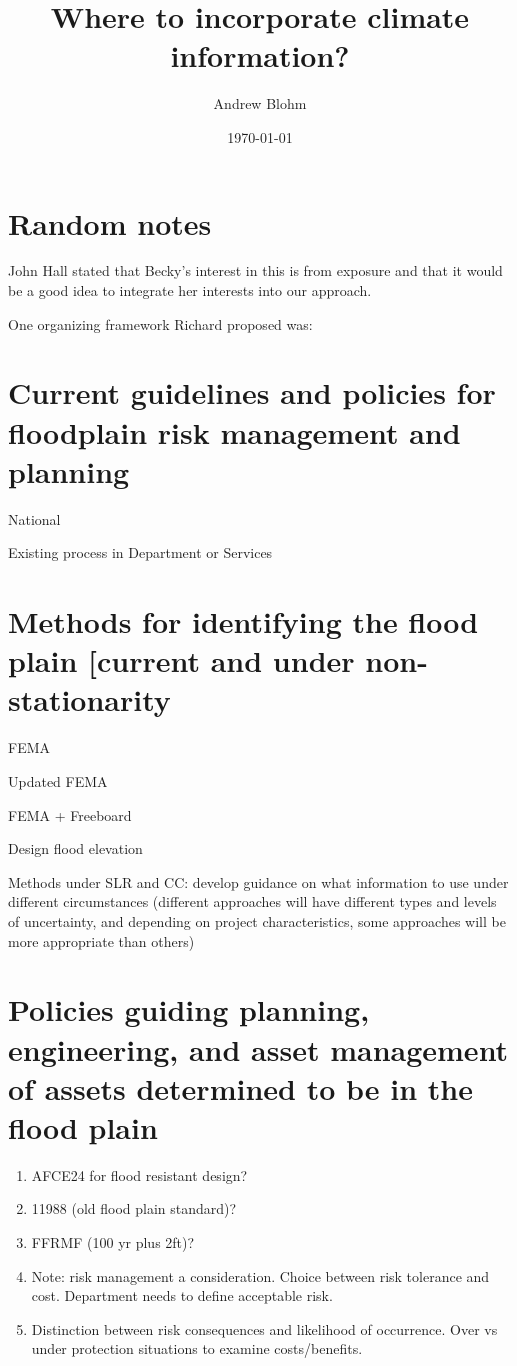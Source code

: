 \documentclass[10pt]{amsart}
\title{Where to incorporate climate information?}
\author{Andrew Blohm}
\date{\today}
\begin{document}
\maketitle
\section{Random notes}
John Hall stated that Becky's interest in this is from exposure and that it would be a good idea to integrate her interests into our approach.

One organizing framework Richard proposed was:
\section{Current guidelines and policies for floodplain risk management and planning}
National

Existing process in Department or Services
\section{Methods for identifying the flood plain [current and under non-stationarity}
FEMA

Updated FEMA

FEMA + Freeboard

Design flood elevation

Methods under SLR and CC: develop guidance on what information to use under different circumstances (different approaches will have different types and levels of uncertainty, and depending on project characteristics, some approaches will be more appropriate than others)

\section{Policies guiding planning, engineering, and asset management of assets determined to be in the flood plain}
\begin{enumerate}
\item AFCE24 for flood resistant design?
\item 11988 (old flood plain standard)?
\item FFRMF (100 yr plus 2ft)?
\item Note: risk management a consideration. Choice between risk tolerance and cost. Department needs to define acceptable risk.
\item Distinction between risk consequences and likelihood of occurrence. Over vs under protection situations to examine costs/benefits.
\end{enumerate}
\end{document}
